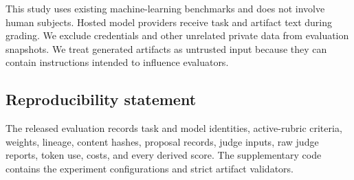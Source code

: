 \documentclass{article} %
\begin{document}
This study uses existing machine-learning benchmarks and does not involve human
subjects. Hosted model providers receive task and artifact text during grading.
We exclude credentials and other unrelated private data from evaluation
snapshots. We treat generated artifacts as untrusted input because they can
contain instructions intended to influence evaluators.

\subsection*{Reproducibility statement}

The released evaluation records task and model identities, active-rubric
criteria, weights, lineage, content hashes, proposal records, judge inputs, raw judge
reports, token use, costs, and every derived score. The supplementary code
contains the experiment configurations and strict artifact validators.




\end{document}
